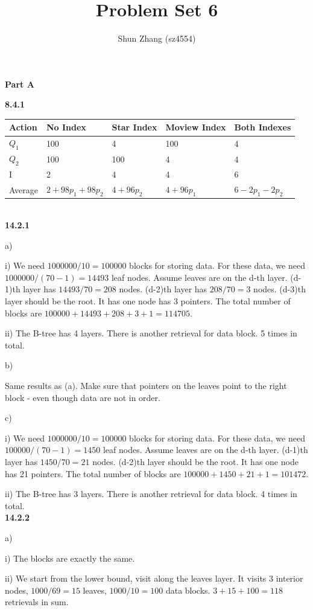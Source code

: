 \documentclass[12pt]{article}
\title{Problem Set 6}
\author{Shun Zhang (sz4554)}
\begin{document}
\maketitle

\textbf{Part A}

\textbf{8.4.1}

\begin{tabular}{l|l l l l}
	Action & No Index & Star Index & Moview Index & Both Indexes\\
	\hline
	$Q_1$ & 100 & 4 & 100 & 4\\
	$Q_2$ & 100 & 100 & 4 &  4\\
	I & 2 & 4 & 4 & 6\\
	\hline
	Average & $2+98p_1+98p_2$ & $4+96p_2$ & $4+96p_1$ & $6-2p_1-2p_2$ \\
\end{tabular}
\\

\textbf{14.2.1}

a)

i) We need $1000000/10=100000$ blocks for storing data. For these data, we need $1000000/(70-1)=14493$ leaf nodes. Assume leaves are on the d-th layer. (d-1)th layer has $14493/70=208$ nodes. (d-2)th layer has $208/70=3$ nodes. (d-3)th layer should be the root. It has one node has 3 pointers. The total number of blocks are $100000+14493+208+3+1=114705$.

ii) The B-tree has 4 layers. There is another retrieval for data block. 5 times in total.

b)

Same results as (a). Make sure that pointers on the leaves point to the right block - even though data are not in order.

c)

i) We need $1000000/10=100000$ blocks for storing data. For these data, we need $100000/(70-1)=1450$ leaf nodes. Assume leaves are on the d-th layer. (d-1)th layer has $1450/70=21$ nodes. (d-2)th layer should be the root. It has one node has 21 pointers. The total number of blocks are $100000+1450+21+1=101472$.

ii) The B-tree has 3 layers. There is another retrieval for data block. 4 times in total.
\\

\textbf{14.2.2}

a)

i) The blocks are exactly the same.

ii) We start from the lower bound, visit along the leaves layer. It visits 3 interior nodes, $1000/69=15$ leaves, $1000/10=100$ data blocks. $3+15+100=118$ retrievals in sum.
\end{document}

